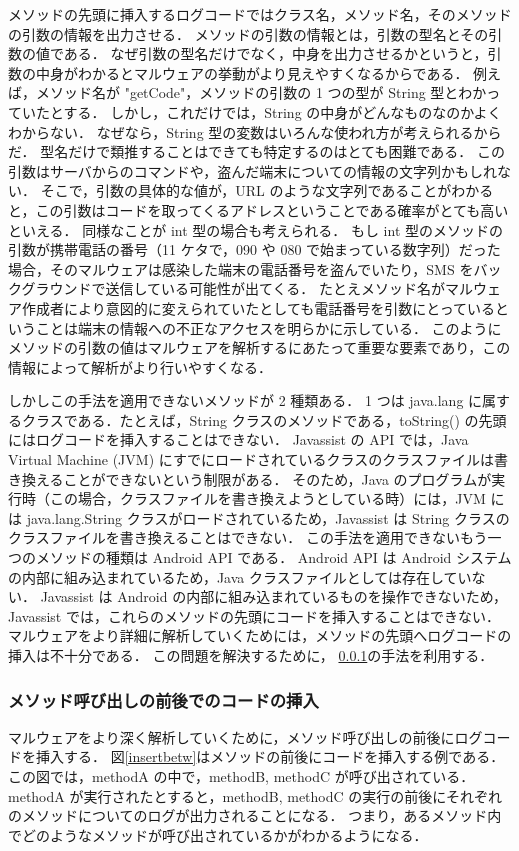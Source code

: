 メソッドの先頭に挿入するログコードではクラス名，メソッド名，そのメソッドの引数の情報を出力させる．
メソッドの引数の情報とは，引数の型名とその引数の値である．
なぜ引数の型名だけでなく，中身を出力させるかというと，引数の中身がわかるとマルウェアの挙動がより見えやすくなるからである．
例えば，メソッド名が "getCode"，メソッドの引数の 1 つの型が String 型とわかっていたとする．
しかし，これだけでは，String の中身がどんなものなのかよくわからない．
なぜなら，String 型の変数はいろんな使われ方が考えられるからだ．
型名だけで類推することはできても特定するのはとても困難である．
この引数はサーバからのコマンドや，盗んだ端末についての情報の文字列かもしれない．
そこで，引数の具体的な値が，URL のような文字列であることがわかると，この引数はコードを取ってくるアドレスということである確率がとても高いといえる．
同様なことが int 型の場合も考えられる．
もし int 型のメソッドの引数が携帯電話の番号（11 ケタで，090 や 080 で始まっている数字列）だった場合，そのマルウェアは感染した端末の電話番号を盗んでいたり，SMS をバックグラウンドで送信している可能性が出てくる．
たとえメソッド名がマルウェア作成者により意図的に変えられていたとしても電話番号を引数にとっているということは端末の情報への不正なアクセスを明らかに示している．
このようにメソッドの引数の値はマルウェアを解析するにあたって重要な要素であり，この情報によって解析がより行いやすくなる．

しかしこの手法を適用できないメソッドが 2 種類ある．
1 つは java.lang に属するクラスである．たとえば，String クラスのメソッドである，toString() の先頭にはログコードを挿入することはできない．
Javassist の API では，Java Virtual Machine (JVM) にすでにロードされているクラスのクラスファイルは書き換えることができないという制限がある．
そのため，Java のプログラムが実行時（この場合，クラスファイルを書き換えようとしている時）には，JVM には java.lang.String クラスがロードされているため，Javassist は String  クラスのクラスファイルを書き換えることはできない．
この手法を適用できないもう一つのメソッドの種類は Android API である．
Android API は Android システムの内部に組み込まれているため，Java クラスファイルとしては存在していない．
Javassist は Android の内部に組み込まれているものを操作できないため，Javassist では，これらのメソッドの先頭にコードを挿入することはできない．
マルウェアをより詳細に解析していくためには，メソッドの先頭へログコードの挿入は不十分である．
この問題を解決するために， \ref{methodcalls}の手法を利用する．

\subsubsection{メソッド呼び出しの前後でのコードの挿入}
\label{methodcalls}
マルウェアをより深く解析していくために，メソッド呼び出しの前後にログコードを挿入する．
図\ref{insertbetw}はメソッドの前後にコードを挿入する例である．
この図では，methodA の中で，methodB, methodC が呼び出されている．methodA が実行されたとすると，methodB, methodC の実行の前後にそれぞれのメソッドについてのログが出力されることになる．
つまり，あるメソッド内でどのようなメソッドが呼び出されているかがわかるようになる．

